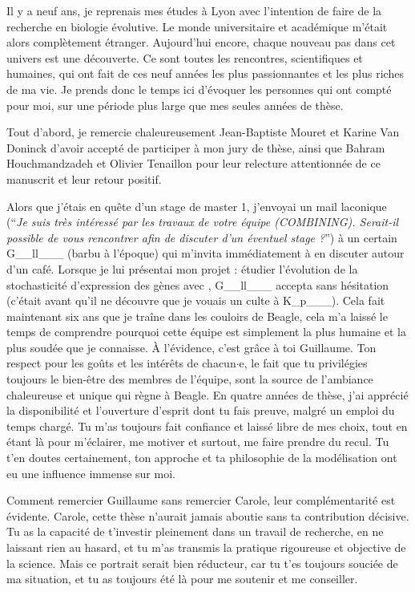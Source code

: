 

Il y a neuf ans, je reprenais mes \'etudes \`a Lyon avec l'intention de faire de la recherche en biologie \'evolutive. Le monde universitaire et acad\'emique m'\'etait alors compl\`etement \'etranger. Aujourd'hui encore, chaque nouveau pas dans cet univers est une d\'ecouverte. Ce sont toutes les rencontres, scientifiques et humaines, qui ont fait de ces neuf ann\'ees les plus passionnantes et les plus riches de ma vie.
Je prends donc le temps ici d'\'evoquer les personnes qui ont compt\'e pour moi, sur une p\'eriode plus large que mes seules ann\'ees de th\`ese.

Tout d'abord, je remercie chaleureusement Jean-Baptiste Mouret et Karine Van Doninck d'avoir accept\'e de participer \`a mon jury de th\`ese, ainsi que Bahram Houchmandzadeh et Olivier Tenaillon pour leur relecture attentionn\'ee de ce manuscrit et leur retour positif.

Alors que j'\'etais en qu\^ete d'un stage de master 1, j'envoyai un mail laconique (``\textit{Je suis tr\`es int\'eress\'e par les travaux de votre \'equipe (COMBINING). Serait-il possible de vous rencontrer afin de discuter d'un \'eventuel stage ?}'') \`a un certain G\_\_ll\_\_\_ (barbu \`a l'\'epoque) qui m'invita imm\'ediatement \`a en discuter autour d'un caf\'e. Lorsque je lui pr\'esentai mon projet : \'etudier l'\'evolution de la stochasticit\'e d'expression des g\`enes avec {\aevol}, G\_\_ll\_\_\_  accepta sans h\'esitation (c'\'etait avant qu'il ne d\'ecouvre que je vouais un culte \`a K\_p\_\_\_).
Cela fait maintenant six ans que je tra\^ine dans les couloirs de Beagle, cela m'a laiss\'e le temps de comprendre pourquoi cette \'equipe est simplement la plus humaine et la plus soud\'ee que je connaisse. \`A l'\'evidence, c'est gr\^ace \`a toi Guillaume. Ton respect pour les go\^uts et les int\'er\^ets de chacun$\cdot$e, le fait que tu privil\'egies toujours le bien-\^etre des membres de l'\'equipe, sont la source de l'ambiance chaleureuse et unique qui r\`egne \`a Beagle. En quatre ann\'ees de th\`ese, j'ai appr\'eci\'e la disponibilit\'e et l'ouverture d'esprit dont tu fais preuve, malgr\'e un emploi du temps charg\'e. Tu m'as toujours fait confiance et laiss\'e libre de mes choix, tout en \'etant l\`a pour m'\'eclairer, me motiver et surtout, me faire prendre du recul. Tu t'en doutes certainement, ton approche et ta philosophie de la mod\'elisation ont eu une influence immense sur moi.

Comment remercier Guillaume sans remercier Carole, leur compl\'ementarit\'e est \'evidente. Carole, cette th\`ese n'aurait jamais aboutie sans ta contribution d\'ecisive. Tu as la capacit\'e de t'investir pleinement dans un travail de recherche, en ne laissant rien au hasard, et tu m'as transmis la pratique rigoureuse et objective de la science. Mais ce portrait serait bien r\'educteur, car tu t'es toujours souci\'ee de ma situation, et tu as toujours \'et\'e l\`a pour me soutenir et me conseiller.

